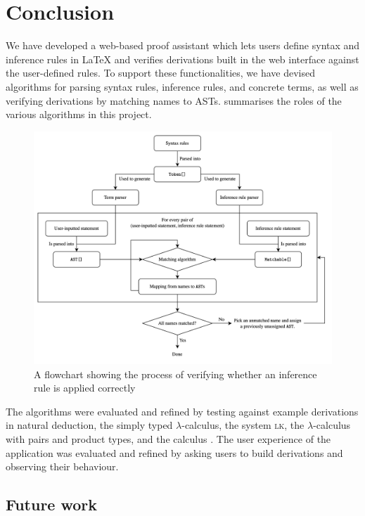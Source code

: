 \chapter{Conclusion}
We have developed a web-based proof assistant which lets users define syntax and inference rules in \LaTeX{} and verifies derivations built in the web interface against the user-defined rules. To support these functionalities, we have devised algorithms for parsing syntax rules, inference rules, and concrete terms, as well as verifying derivations by matching names to ASTs.  summarises the roles of the various algorithms in this project.

\begin{figure}[!htbp]
    \centering
    \includegraphics[width=\textwidth]{conclusion/flowchart.png}
    \caption{A flowchart showing the process of verifying whether an inference rule is applied correctly}
    \label{fig:conclusion:flowchart}
\end{figure}

The algorithms were evaluated and refined by testing against example derivations in natural deduction, the simply typed $\lambda$-calculus, the system \textsc{lk}, the $\lambda$-calculus with pairs and product types, and the calculus \lbm. The user experience of the application was evaluated and refined by asking users to build derivations and observing their behaviour.

\section{Future work}
